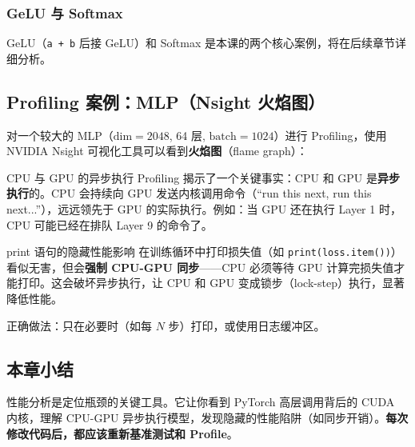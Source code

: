 \subsubsection{GeLU 与 Softmax}

GeLU（\texttt{a + b} 后接 GeLU）和 Softmax 是本课的两个核心案例，将在后续章节详细分析。

\subsection{Profiling 案例：MLP（Nsight 火焰图）}

对一个较大的 MLP（$\text{dim}=2048$, 64 层, $\text{batch}=1024$）进行 Profiling，使用 NVIDIA Nsight 可视化工具可以看到\textbf{火焰图}（flame graph）：

\begin{knowledgebox}{CPU 与 GPU 的异步执行}
Profiling 揭示了一个关键事实：CPU 和 GPU 是\textbf{异步执行}的。CPU 会持续向 GPU 发送内核调用命令（``run this next, run this next...''），远远领先于 GPU 的实际执行。例如：当 GPU 还在执行 Layer 1 时，CPU 可能已经在排队 Layer 9 的命令了。
\end{knowledgebox}

\begin{warningbox}{print 语句的隐藏性能影响}
在训练循环中打印损失值（如 \texttt{print(loss.item())}）看似无害，但会\textbf{强制 CPU-GPU 同步}——CPU 必须等待 GPU 计算完损失值才能打印。这会破坏异步执行，让 CPU 和 GPU 变成锁步（lock-step）执行，显著降低性能。

正确做法：只在必要时（如每 $N$ 步）打印，或使用日志缓冲区。
\end{warningbox}

\subsection{本章小结}

性能分析是定位瓶颈的关键工具。它让你看到 PyTorch 高层调用背后的 CUDA 内核，理解 CPU-GPU 异步执行模型，发现隐藏的性能陷阱（如同步开销）。\textbf{每次修改代码后，都应该重新基准测试和 Profile}。


